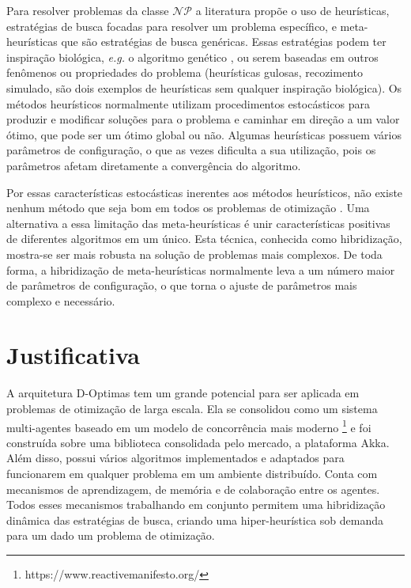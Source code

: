 Para resolver problemas da classe $\mathcal{NP}$ a literatura propõe o uso de heurísticas, estratégias de busca focadas para resolver um problema específico, e meta-heurísticas que são estratégias de busca genéricas. Essas estratégias podem ter inspiração biológica, \textit{e.g.} o algoritmo genético \cite{whitley1994}, ou serem baseadas em outros fenômenos ou propriedades do problema (heurísticas gulosas, recozimento simulado, são dois exemplos de heurísticas sem qualquer inspiração biológica). Os métodos heurísticos normalmente utilizam procedimentos estocásticos para produzir e modificar soluções para o problema e caminhar em direção a um valor ótimo, que pode ser um ótimo global ou não. Algumas heurísticas possuem vários parâmetros de configuração, o que as vezes dificulta a sua utilização, pois os parâmetros afetam diretamente a convergência do algoritmo. 

Por essas características estocásticas inerentes aos métodos heurísticos, não existe nenhum método que seja bom em todos os problemas de otimização \cite[p. 30-32]{eiben2015}. Uma alternativa a essa limitação das meta-heurísticas é unir características positivas de diferentes algoritmos em um único. Esta técnica, conhecida como hibridização,  mostra-se ser mais robusta na solução de problemas mais complexos. De toda forma, a hibridização de meta-heurísticas normalmente leva a um número maior de parâmetros de configuração, o que torna o ajuste de parâmetros mais complexo e necessário.


\section{Justificativa}

A arquitetura D-Optimas tem um grande potencial para ser aplicada em problemas de otimização de larga escala. Ela se consolidou como um sistema multi-agentes baseado em um modelo de concorrência mais moderno \footnote{https://www.reactivemanifesto.org/} e foi construída sobre uma biblioteca consolidada pelo mercado, a plataforma Akka. Além disso, possui vários algoritmos implementados e adaptados para funcionarem em qualquer problema em um ambiente distribuído. Conta com mecanismos de aprendizagem, de memória e de colaboração entre os agentes. Todos esses mecanismos trabalhando em conjunto permitem uma hibridização dinâmica das estratégias de busca, criando uma hiper-heurística sob demanda para um dado um problema de otimização.


